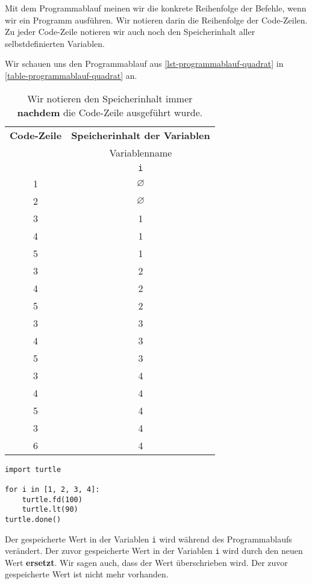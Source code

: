 Mit dem Programmablauf meinen wir die konkrete Reihenfolge der Befehle, wenn wir ein Programm ausführen. Wir notieren darin die Reihenfolge der Code-Zeilen. Zu jeder Code-Zeile notieren wir auch noch den Speicherinhalt aller selbstdefinierten Variablen.

\begin{example}
Wir schauen uns den Programmablauf aus \autoref{lst-programmablauf-quadrat} in \autoref{table-programmablauf-quadrat} an.

\begin{table}[htb]
\centering
\begin{minipage}{0.4\textwidth}
\centering
\begin{tabular}{cc}
\toprule
\textbf{Code-Zeile} & \textbf{Speicherinhalt der Variablen} \\
			   & Variablenname \\
			   & \lstinline[]$i$ \\
\midrule
1 & $\varnothing$ \\
2 & $\varnothing$ \\ \hline
3 & 1 \\
4 & 1 \\
5 & 1 \\ \hline
3 & 2 \\
4 & 2 \\
5 & 2 \\ \hline
3 & 3 \\
4 & 3 \\
5 & 3 \\ \hline
3 & 4 \\
4 & 4 \\
5 & 4 \\
3 & 4 \\
6 & 4 \\
\bottomrule
\end{tabular}
\caption{Wir notieren den Speicherinhalt immer \textbf{nachdem} die Code-Zeile ausgeführt wurde.}
\label{table-programmablauf-quadrat}
\end{minipage}
\hfill
\begin{minipage}{0.45\textwidth}
\centering
	\begin{lstlisting}[caption={Zeile vier und fünf wird jeweils viermal ausgeführt (\graybgtexttt{quadrat\_loop.py}).}, label={lst-programmablauf-quadrat}]
import turtle

for i in [1, 2, 3, 4]:
    turtle.fd(100)
    turtle.lt(90)
turtle.done()
\end{lstlisting}

\begin{important}
	Der gespeicherte Wert in der Variablen \lstinline{i} wird während des Programmablaufs verändert. Der zuvor gespeicherte Wert in der Variablen \lstinline{i} wird durch den neuen Wert \textbf{ersetzt}. Wir sagen auch, dass der Wert überschrieben wird. Der zuvor gespeicherte Wert ist nicht mehr vorhanden.
\end{important}


\end{minipage}
\end{table}
\end{example}
